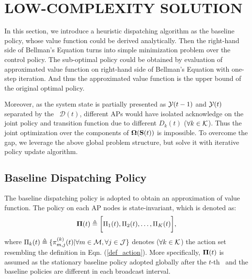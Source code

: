 \section{LOW-COMPLEXITY SOLUTION}
In this section, we introduce a heuristic dispatching algorithm as the baseline policy, whose value function could be derived analytically.
Then the right-hand side of Bellman's Equation turns into simple minimization problem over the control policy. The sub-optimal policy could be obtained by evaluation of approximated value function on right-hand side of Bellman's Equation with one-step iteration. And thus the approximated value function is the upper bound of the original optimal policy.

Moreover, as the system state is partially presented as $\mathcal{Y}({t-1})$ and $\mathcal{Y}(t)$ separated by the \brlatency~$\mathcal{D}(t)$, different APs would have isolated acknowledge on the joint policy and transition function due to different $D_k(t)$ ($\forall k\in\mathcal{K}$).
Thus the joint optimization over the components of $\boldsymbol{\Omega}(\mathbf{S}(t))$ is impossible.
To overcome the gap, we leverage the above global problem structure, but solve it with iterative policy update algorithm.

\subsection{Baseline Dispatching Policy}
The baseline dispatching policy is adopted to obtain an approximation of value function. The policy on each AP nodes is state-invariant, which is denoted as:
\begin{align}
    \boldsymbol{\Pi}(t) \triangleq \bigg[\Pi_1(t), \Pi_2(t), \dots, \Pi_K(t)\bigg],
\end{align}
where $\Pi_k(t) \triangleq \{\pi^{(k)}_{m,j}(t) | \forall m\in\mathcal{M},\forall j\in\mathcal{J}\}$ denotes ($\forall k\in\mathcal{K}$) the action set resembling the definition in Eqn. (\ref{def_action}).
More specifically, $\boldsymbol{\Pi}(t)$ is assumed as the stationary baseline policy adopted globally after the $t$-th \brpoint~and the baseline policies are different in each broadcast interval.

